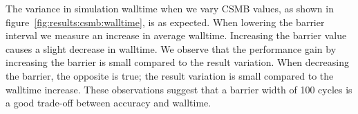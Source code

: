 The variance in simulation walltime when we vary CSMB values, as shown in figure~\ref{fig:results:csmb:walltime}, is as expected. 
When lowering the barrier interval we measure an increase in average walltime.
Increasing the barrier value causes a slight decrease in walltime.
We observe that the performance gain by increasing the barrier is small compared to the result variation. 
When decreasing the barrier, the opposite is true; the result variation is small compared to the walltime increase.
These observations suggest that a barrier width of 100 cycles is a good trade-off between accuracy and walltime.